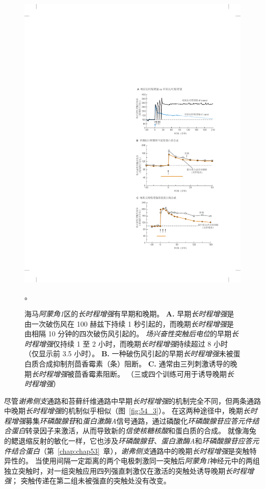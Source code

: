 \begin{figure}[htbp]
	\centering
	\includegraphics[width=0.65\linewidth]{chap54/fig_54_5}
	\caption{海马\textit{阿蒙角1}区的\textit{长时程增强}有早期和晚期。
		\textbf{A.} 早期\textit{长时程增强}是由一次破伤风在 100 赫兹下持续 1 秒引起的，而晚期\textit{长时程增强}是由相隔 10 分钟的四次破伤风引起的。
		\textit{场兴奋性突触后电位}的早期\textit{长时程增强}仅持续 1 至 2 小时，而晚期\textit{长时程增强}持续超过 8 小时（仅显示前 3.5 小时）。
		\textbf{B.} 一种破伤风引起的早期\textit{长时程增强}未被蛋白质合成抑制剂茴香霉素（条）阻断。
		\textbf{C.} 通常由三列刺激诱导的晚期\textit{长时程增强}被茴香霉素阻断。
		（三或四个训练可用于诱导晚期\textit{长时程增强}）\cite{huang1994recruitment}}。
	\label{fig:54_5}
\end{figure}


尽管\textit{谢弗侧支}通路和苔藓纤维通路中早期\textit{长时程增强}的机制完全不同，但两条通路中晚期\textit{长时程增强}的机制似乎相似（图~\ref{fig:54_3}）。
在这两种途径中，晚期\textit{长时程增强}募集\textit{环磷酸腺苷}和\textit{蛋白激酶A}信号通路，通过磷酸化\textit{环磷酸腺苷应答元件结合蛋白}转录因子来激活，从而导致新的\textit{信使核糖核酸}和蛋白质的合成。
就像海兔的鳃退缩反射的敏化一样，它也涉及\textit{环磷酸腺苷}、\textit{蛋白激酶A}和\textit{环磷酸腺苷应答元件结合蛋白}（第~\ref{chap:chap53}~章），\textit{谢弗侧支}通路中的晚期\textit{长时程增强}是突触特异性的。 当使用间隔一定距离的两个电极刺激同一突触后\textit{阿蒙角1}神经元中的两组独立突触时，对一组突触应用四列强直刺激仅在激活的突触处诱导晚期\textit{长时程增强}；
突触传递在第二组未被强直的突触处没有改变。


